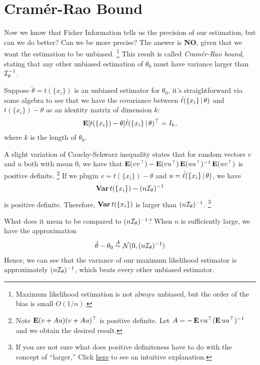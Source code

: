 \documentclass[a4paper]{article}
\begin{document}
\section{Cramér-Rao Bound}

Now we know that Fisher Information tells us the precision of our estimation,
but can we do better?
Can we be more precise?
The answer is \textbf{NO}, given that we want the estimation to be unbiased.
\footnote{
	Maximum likelihood estimation is not always unbiased,
	but the order of the bias is small $O(1/n)$.
}
This result is called \emph{Cramér-Rao bound},
stating that any other unbiased estimation of $\theta_0$ must have variance larger than $\mathcal{I}_{\theta}^{-1}$.

Suppose $\tilde\theta=t(\{x_i\})$ is an unbiased estimator for $\theta_0$,
it's straightforward via some algebra to see that
we have the covariance between $\dot\ell(\{x_i\}\,|\,\theta)$ and $t(\{x_i\})-\theta$ as an identity matrix of dimension $k$:
\begin{align*}
\operatorname{\text{\textrm{\upshape\textbf{E}}}} [t(\{x_i\})-\theta] \dot\ell(\{x_i\}\,|\,\theta)^{\top}
= I_k,
\end{align*}
where $k$ is the length of $\theta_0$.

A slight variation of Cauchy-Schwarz inequality states that
for random vectors $v$ and $u$ both with mean $0$, we have that
$\operatorname{\text{\textrm{\upshape\textbf{E}}}}(vv^{\top}) - \operatorname{\text{\textrm{\upshape\textbf{E}}}}(vu^{\top})\operatorname{\text{\textrm{\upshape\textbf{E}}}}(uu^{\top})^{-1}\operatorname{\text{\textrm{\upshape\textbf{E}}}}(uv^{\top})$
is positive definite. 
\footnote{
	Note $\operatorname{\text{\textrm{\upshape\textbf{E}}}}(v+Au)(v+Au)^{\top}$ is positive definite.
	Let $A=-\operatorname{\text{\textrm{\upshape\textbf{E}}}}{vu^{\top}}(\operatorname{\text{\textrm{\upshape\textbf{E}}}}{uu^{\top}})^{-1}$ and we obtain the desired result.
}
If we plugin $v=t(\{x_i\})-\theta$ and $u=\dot\ell(\{x_i\}\,|\,\theta)$,
we have
\begin{align*}
	\operatorname{\text{\textrm{\upshape\textbf{Var}}}} t(\{x_i\}) - (n\mathcal{I}_{\theta})^{-1}
\end{align*}
is positive definite.
Therefore, $\operatorname{\text{\textrm{\upshape\textbf{Var}}}}{t(\{x_i\})}$ is larger than $(n\mathcal{I}_{\theta})^{-1}$.
\footnote{
	If you are not sure what does positive definiteness have to do with the concept of ``larger,''
	Click \href{https://jessekelighine.com\#statistics}{here} to see an intuitive explanation.
}

What does it mean to be compared to $(n\mathcal{I}_\theta)^{-1}$?
When $n$ is sufficiently large, we have the approximation
\begin{align*}
	\hat\theta - \theta_0 \overset{A}{\sim} \mathcal{N}(0,(n\mathcal{I}_\theta)^{-1})
\end{align*}
Hence, we can see that the variance of our maximum likelihood estimator is approximately $(n\mathcal{I}_{\theta})^{-1}$,
which beats every other unbiased estimator.
\end{document}
